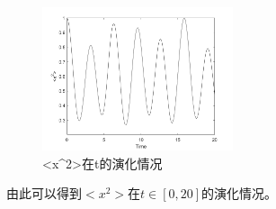 \documentclass[UTF8,a4paper,10pt]{ctexart}
\begin{document}
	\begin{figure}[!htbp]
		\centering
		\includegraphics[width=0.5\textwidth,height=0.4\textwidth]{pictures/x22.png}
		\caption{<x^2>在t\in [0,20]的演化情况} \label{p1}
	\end{figure}
由此可以得到$<x^2>$在$t\in[0,20]$的演化情况。


\




\end{document}
